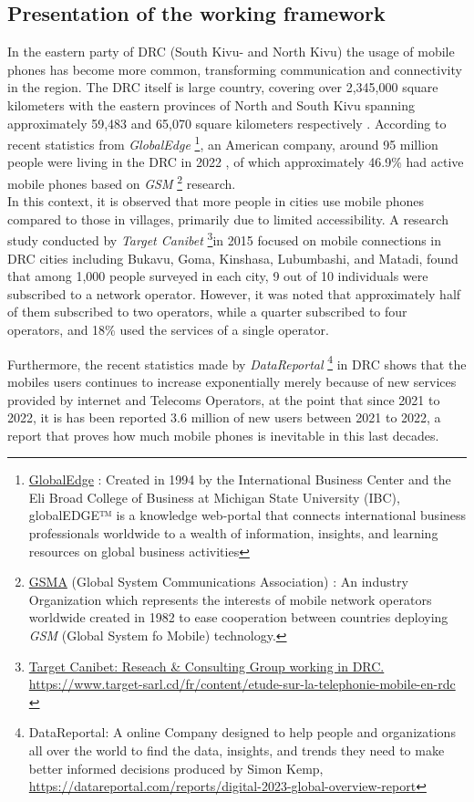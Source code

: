 \documentclass[12pt,a4paper]{report}
\begin{document}
		\subsection{Presentation of the working framework}  
		In the eastern party of DRC (South Kivu- and North Kivu) the usage of mobile phones has become more common, transforming communication and connectivity in the region. 
	The DRC itself is large country, covering over 2,345,000 square kilometers with the eastern provinces of North and South Kivu spanning approximately 59,483 and 65,070 square kilometers respectively \cite{giswatch2018}. According to recent statistics from \textit{GlobalEdge} \footnote{ \href{https://globaledge.msu.edu/}{GlobalEdge}  : Created in 1994 by the International Business Center and the Eli Broad College of Business at Michigan State University (IBC), globalEDGE™ is a knowledge web-portal that connects international business professionals worldwide to a wealth of information, insights, and learning resources on global business activities}, an American company, around 95 million people were living in the DRC in 2022 \cite{monusco2015}, of which approximately 46.9\% had active mobile phones based on \textit{GSM} \footnote{\href{https://www.gsma.com/aboutus/}{GSMA}  (Global System Communications Association) : An industry Organization which represents the interests of mobile network operators worldwide created in 1982 to ease cooperation between countries deploying \textit{GSM} (Global System fo Mobile) technology.} research. \\ 
		
		
		In this context, it is observed that more people in cities use mobile phones compared to those in villages, primarily due to limited accessibility. A research study conducted by \textit{Target Canibet} \footnote{\href{https://www.target-sarl.cd/fr/content/etude-sur-la-telephonie-mobile-en-rdc}{Target Canibet: Reseach \& Consulting Group working in DRC. \url{https://www.target-sarl.cd/fr/content/etude-sur-la-telephonie-mobile-en-rdc} }}in 2015 focused on mobile connections in DRC cities including Bukavu, Goma, Kinshasa, Lubumbashi, and Matadi, found that among 1,000 people surveyed in each city, 9 out of 10 individuals were subscribed to a network operator. However, it was noted that approximately half of them subscribed to two operators, while a quarter subscribed to four operators, and 18\% used the services of a single operator.  
		
		Furthermore, the recent statistics made by \textit{DataReportal} \footnote{DataReportal: A online Company designed to help people and organizations all over the world to find the data, insights, and trends they need to make better informed decisions produced by Simon Kemp, \url{https://datareportal.com/reports/digital-2023-global-overview-report}}  in DRC shows that the mobiles users continues to increase exponentially merely because of new services provided by internet and Telecoms Operators, at the point that since 2021 to 2022, it is has been reported 3.6 million of new users between 2021 to 2022, a report that proves how much mobile phones is inevitable in this last decades.
			
\end{document}
